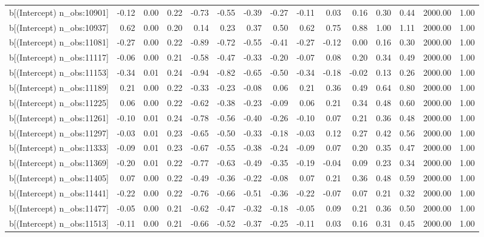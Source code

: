 \begin{table}[ht]
\begin{tabular}{rrrrrrrrrrrrrrr}
  b[(Intercept) n\_obs:10901] & -0.12 & 0.00 & 0.22 & -0.73 & -0.55 & -0.39 & -0.27 & -0.11 & 0.03 & 0.16 & 0.30 & 0.44 & 2000.00 & 1.00 \\ 
  b[(Intercept) n\_obs:10937] & 0.62 & 0.00 & 0.20 & 0.14 & 0.23 & 0.37 & 0.50 & 0.62 & 0.75 & 0.88 & 1.00 & 1.11 & 2000.00 & 1.00 \\ 
  b[(Intercept) n\_obs:11081] & -0.27 & 0.00 & 0.22 & -0.89 & -0.72 & -0.55 & -0.41 & -0.27 & -0.12 & 0.00 & 0.16 & 0.30 & 2000.00 & 1.00 \\ 
  b[(Intercept) n\_obs:11117] & -0.06 & 0.00 & 0.21 & -0.58 & -0.47 & -0.33 & -0.20 & -0.07 & 0.08 & 0.20 & 0.34 & 0.49 & 2000.00 & 1.00 \\ 
  b[(Intercept) n\_obs:11153] & -0.34 & 0.01 & 0.24 & -0.94 & -0.82 & -0.65 & -0.50 & -0.34 & -0.18 & -0.02 & 0.13 & 0.26 & 2000.00 & 1.00 \\ 
  b[(Intercept) n\_obs:11189] & 0.21 & 0.00 & 0.22 & -0.33 & -0.23 & -0.08 & 0.06 & 0.21 & 0.36 & 0.49 & 0.64 & 0.80 & 2000.00 & 1.00 \\ 
  b[(Intercept) n\_obs:11225] & 0.06 & 0.00 & 0.22 & -0.62 & -0.38 & -0.23 & -0.09 & 0.06 & 0.21 & 0.34 & 0.48 & 0.60 & 2000.00 & 1.00 \\ 
  b[(Intercept) n\_obs:11261] & -0.10 & 0.01 & 0.24 & -0.78 & -0.56 & -0.40 & -0.26 & -0.10 & 0.07 & 0.21 & 0.36 & 0.48 & 2000.00 & 1.00 \\ 
  b[(Intercept) n\_obs:11297] & -0.03 & 0.01 & 0.23 & -0.65 & -0.50 & -0.33 & -0.18 & -0.03 & 0.12 & 0.27 & 0.42 & 0.56 & 2000.00 & 1.00 \\ 
  b[(Intercept) n\_obs:11333] & -0.09 & 0.01 & 0.23 & -0.67 & -0.55 & -0.38 & -0.24 & -0.09 & 0.07 & 0.20 & 0.35 & 0.47 & 2000.00 & 1.00 \\ 
  b[(Intercept) n\_obs:11369] & -0.20 & 0.01 & 0.22 & -0.77 & -0.63 & -0.49 & -0.35 & -0.19 & -0.04 & 0.09 & 0.23 & 0.34 & 2000.00 & 1.00 \\ 
  b[(Intercept) n\_obs:11405] & 0.07 & 0.00 & 0.22 & -0.49 & -0.36 & -0.22 & -0.08 & 0.07 & 0.21 & 0.36 & 0.48 & 0.59 & 2000.00 & 1.00 \\ 
  b[(Intercept) n\_obs:11441] & -0.22 & 0.00 & 0.22 & -0.76 & -0.66 & -0.51 & -0.36 & -0.22 & -0.07 & 0.07 & 0.21 & 0.32 & 2000.00 & 1.00 \\ 
  b[(Intercept) n\_obs:11477] & -0.05 & 0.00 & 0.21 & -0.62 & -0.47 & -0.32 & -0.18 & -0.05 & 0.09 & 0.21 & 0.36 & 0.50 & 2000.00 & 1.00 \\ 
  b[(Intercept) n\_obs:11513] & -0.11 & 0.00 & 0.21 & -0.66 & -0.52 & -0.37 & -0.25 & -0.11 & 0.03 & 0.16 & 0.31 & 0.45 & 2000.00 & 1.00 \\ 

\end{tabular}
\end{table}
